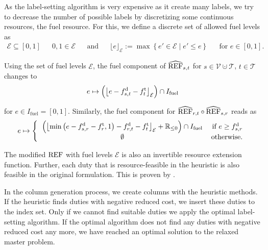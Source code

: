 As the label-setting algorithm is very expensive as it create many labels, we try to decrease the number of possible labels by discretizing some continuous resources, \eg the fuel resource. For this, we define a discrete set of allowed fuel levels as
\begin{align*}
	\mathcal{E}\subseteq[0,1] && 0,1\in\mathcal{E} && \text{and} && \lfloor e\rfloor_{\mathcal{E}} := \max\left\{e'\in\mathcal{E}\mid e'\leq e\right\} && \text{for } e\in[0,1].
\end{align*}

Using the set of fuel levels $\mathcal{E}$, the fuel component of $\widehat{\operatorname{REF}}_{s,t}$ for ${s\in\mathcal{V}\cupdot\mathcal{T}}$, ${t\in\mathcal{T}}$ changes to
\begin{align*}
	e\mapsto \left(\left\lfloor e - f^{\operatorname{d}}_{s,t} - f^{\operatorname{t}}_t\right\rfloor_{\mathcal{E}}\right)\cap I_{\operatorname{fuel}}
\end{align*}

for $e\in I_{\operatorname{fuel}} = [0,1]$. Similarly, the fuel component for ${\widehat{\operatorname{REF}}_{r,t}\circ\widehat{\operatorname{REF}}_{s,r}}$ reads as
\begin{align*}
	e\mapsto \left\{\begin{tabular}{cr}
		$\displaystyle{\left(\left\lfloor\min\left(e - \fd_{s,r} - \ft_r, 1\right) - \fd_{r,t} - \ft_t\right\rfloor_{\mathcal{E}} + \mathbb{R}_{\leq 0}\right)\cap I_{\operatorname{fuel}}}$ & if $e\geq \fd_{s,r}$ \\
		$\emptyset$ & otherwise.
	\end{tabular}\right.
\end{align*}

The modified $\operatorname{REF}$ with fuel levels $\mathcal{E}$ is also an invertible resource extension function. Further, each duty that is resource-feasible in the heuristic is also feasible in the original formulation. This is proven by \cite{Kaiser}.

In the column generation process, we create columns with the heuristic methods. If the heuristic finds duties with negative reduced cost, we insert these duties to the index set. Only if we cannot find suitable duties we apply the optimal label-setting algorithm. If the optimal algorithm does not find any duties with negative reduced cost any more, we have reached an optimal solution to the relaxed master problem.


